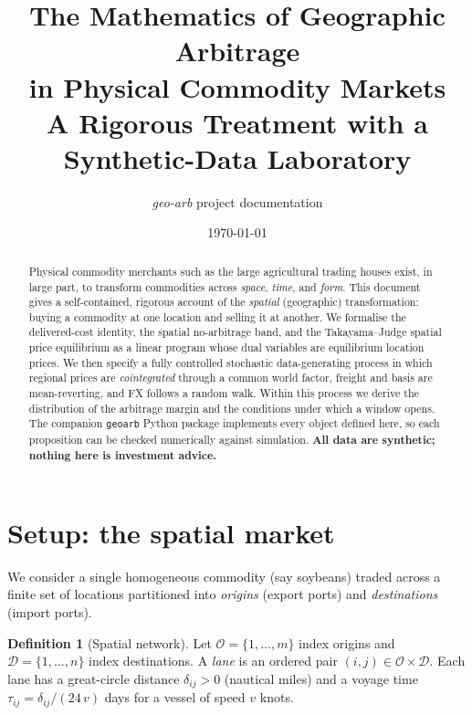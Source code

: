 \documentclass[11pt]{article}
\title{\textbf{The Mathematics of Geographic Arbitrage\\ in Physical Commodity Markets}\\[4pt]
\large A Rigorous Treatment with a Synthetic-Data Laboratory}
\author{\textit{geo-arb} project documentation}
\date{\today}
\theoremstyle{definition}
\newtheorem{definition}{Definition}
\theoremstyle{plain}
\begin{document}
\maketitle

\begin{abstract}
\noindent
Physical commodity merchants such as the large agricultural trading houses exist,
in large part, to transform commodities across \emph{space}, \emph{time}, and
\emph{form}. This document gives a self-contained, rigorous account of the
\emph{spatial} (geographic) transformation: buying a commodity at one location
and selling it at another. We formalise the delivered-cost identity, the
spatial no-arbitrage band, and the Takayama--Judge spatial price equilibrium as
a linear program whose dual variables are equilibrium location prices. We then
specify a fully controlled stochastic data-generating process in which regional
prices are \emph{cointegrated} through a common world factor, freight and basis
are mean-reverting, and FX follows a random walk. Within this process we derive
the distribution of the arbitrage margin and the conditions under which a
window opens. The companion \texttt{geoarb} Python package implements every
object defined here, so each proposition can be checked numerically against
simulation. \textbf{All data are synthetic; nothing here is investment advice.}
\end{abstract}

\tableofcontents
\bigskip

\section{Setup: the spatial market}
\label{sec:setup}

We consider a single homogeneous commodity (say soybeans) traded across a
finite set of locations partitioned into \emph{origins} (export ports) and
\emph{destinations} (import ports).

\begin{definition}[Spatial network]
Let $\mathcal{O}=\{1,\dots,m\}$ index origins and $\mathcal{D}=\{1,\dots,n\}$
index destinations. A \emph{lane} is an ordered pair $(i,j)\in\mathcal{O}\times
\mathcal{D}$. Each lane has a great-circle distance $\delta_{ij}>0$ (nautical
miles) and a voyage time $\tau_{ij}=\delta_{ij}/(24\,v)$ days for a vessel of
speed $v$ knots.
\end{definition}
\end{document}
